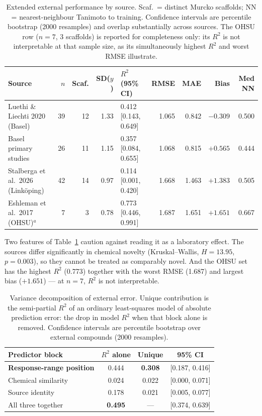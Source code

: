 \documentclass[11pt,a4paper]{article}
\begin{document}
\begin{table}[tb]
\centering
\footnotesize
\setlength{\tabcolsep}{4pt}
\caption{Extended external performance by source. Scaf.\ = distinct Murcko scaffolds;
NN = nearest-neighbour Tanimoto to training. Confidence intervals are percentile
bootstrap (2000 resamples) and overlap substantially across sources. The OHSU row
($n=7$, 3 scaffolds) is reported for completeness only: its $R^2$ is not
interpretable at that sample size, as its simultaneously highest $R^2$ and worst
RMSE illustrate.}
\label{tab:source}
\begin{tabular}{lrrrlrrrr}
\toprule
Source & $n$ & Scaf. & SD($y$) & $R^2$ (95\% CI) & RMSE & MAE & Bias & Med NN \\
\midrule
Luethi \& Liechti 2020 (Basel) & 39 & 12 & 1.33 & 0.412 [0.143, 0.649] & 1.065 & 0.842 & $-0.309$ & 0.500 \\
Basel primary studies & 26 & 11 & 1.15 & 0.357 [0.084, 0.655] & 1.068 & 0.815 & $+0.565$ & 0.444 \\
Stalberga et al.\ 2026 (Link\"oping) & 42 & 14 & 0.97 & 0.114 [0.001, 0.420] & 1.668 & 1.463 & $+1.383$ & 0.505 \\
Eshleman et al.\ 2017 (OHSU)$^{a}$ & 7 & 3 & 0.78 & 0.773 [0.446, 0.991] & 1.687 & 1.651 & $+1.651$ & 0.667 \\
\bottomrule
\end{tabular}
\end{table}

Two features of Table~\ref{tab:source} caution against reading it as a laboratory
effect. The sources differ significantly in chemical novelty (Kruskal--Wallis,
$H=13.95$, $p=0.003$), so they cannot be treated as comparably novel. And the OHSU set
has the highest $R^2$ (0.773) together with the worst RMSE (1.687) and largest bias
($+1.651$) --- at $n=7$, $R^2$ is not interpretable.

\begin{table}[tb]
\centering
\small
\caption{Variance decomposition of external error. Unique contribution is the
semi-partial $R^2$ of an ordinary least-squares model of absolute prediction error:
the drop in model $R^2$ when that block alone is removed. Confidence intervals are
percentile bootstrap over external compounds (2000 resamples).}
\label{tab:vardecomp}
\begin{tabular}{lccc}
\toprule
Predictor block & $R^2$ alone & \textbf{Unique} & 95\% CI \\
\midrule
\textbf{Response-range position} & 0.444 & \textbf{0.308} & [0.187, 0.416] \\
Chemical similarity              & 0.024 & 0.022 & [0.000, 0.071] \\
Source identity                  & 0.178 & 0.021 & [0.005, 0.077] \\
\midrule
All three together               & \textbf{0.495} & --- & [0.374, 0.639] \\
\bottomrule
\end{tabular}
\end{table}
\end{document}
